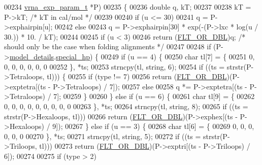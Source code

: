 \begin{DoxyCode}
00234               \hyperlink{group__energy__parameters_structvrna__exp__param__s}{vrna\_exp\_param\_t}  *P)
00235 \{
00236   \textcolor{keywordtype}{double} q, kT;
00237 
00238   kT = P->kT;   \textcolor{comment}{/* kT in cal/mol  */}
00239 
00240   \textcolor{keywordflow}{if} (u <= 30)
00241     q = P->exphairpin[u];
00242   \textcolor{keywordflow}{else}
00243     q = P->exphairpin[30] * exp(-(P->lxc * log(u / 30.)) * 10. / kT);
00244 
00245   \textcolor{keywordflow}{if} (u < 3)
00246     \textcolor{keywordflow}{return} (\hyperlink{group__data__structures_ga31125aeace516926bf7f251f759b6126}{FLT\_OR\_DBL})q;         \textcolor{comment}{/* should only be the case when folding alignments */}
00247 
00248   \textcolor{keywordflow}{if} (P->\hyperlink{group__energy__parameters_ac18055127bccc27c1223f1d2f3b01b53}{model\_details}.\hyperlink{group__model__details_add64a96d23e77ef1d0ddf8dfc5228143}{special\_hp}) \{
00249     \textcolor{keywordflow}{if} (u == 4) \{
00250       \textcolor{keywordtype}{char} tl[7] = \{
00251         0, 0, 0, 0, 0, 0, 0
00252       \}, *ts;
00253       strncpy(tl, \textcolor{keywordtype}{string}, 6);
00254       \textcolor{keywordflow}{if} ((ts = strstr(P->Tetraloops, tl))) \{
00255         \textcolor{keywordflow}{if} (type != 7)
00256           \textcolor{keywordflow}{return} (\hyperlink{group__data__structures_ga31125aeace516926bf7f251f759b6126}{FLT\_OR\_DBL})(P->exptetra[(ts - P->Tetraloops) / 7]);
00257         \textcolor{keywordflow}{else}
00258           q *= P->exptetra[(ts - P->Tetraloops) / 7];
00259       \}
00260     \} \textcolor{keywordflow}{else} \textcolor{keywordflow}{if} (u == 6) \{
00261       \textcolor{keywordtype}{char} tl[9] = \{
00262         0, 0, 0, 0, 0, 0, 0, 0, 0
00263       \}, *ts;
00264       strncpy(tl, \textcolor{keywordtype}{string}, 8);
00265       \textcolor{keywordflow}{if} ((ts = strstr(P->Hexaloops, tl)))
00266         \textcolor{keywordflow}{return} (\hyperlink{group__data__structures_ga31125aeace516926bf7f251f759b6126}{FLT\_OR\_DBL})(P->exphex[(ts - P->Hexaloops) / 9]);
00267     \} \textcolor{keywordflow}{else} \textcolor{keywordflow}{if} (u == 3) \{
00268       \textcolor{keywordtype}{char} tl[6] = \{
00269         0, 0, 0, 0, 0, 0
00270       \}, *ts;
00271       strncpy(tl, \textcolor{keywordtype}{string}, 5);
00272       \textcolor{keywordflow}{if} ((ts = strstr(P->Triloops, tl)))
00273         \textcolor{keywordflow}{return} (\hyperlink{group__data__structures_ga31125aeace516926bf7f251f759b6126}{FLT\_OR\_DBL})(P->exptri[(ts - P->Triloops) / 6]);
00274 
00275       \textcolor{keywordflow}{if} (type > 2)

\end{DoxyCode}
